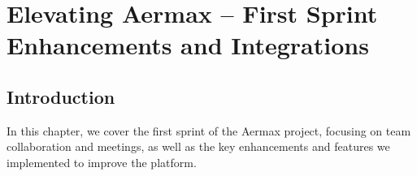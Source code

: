 \chapter{Elevating Aermax – First Sprint Enhancements and Integrations}
\minitoc
\newpage
\setcounter{secnumdepth}{0} %

\section{Introduction}
In this chapter, we cover the first sprint of the Aermax project, focusing on team collaboration and meetings, as well as the key enhancements and features we implemented to improve the platform.